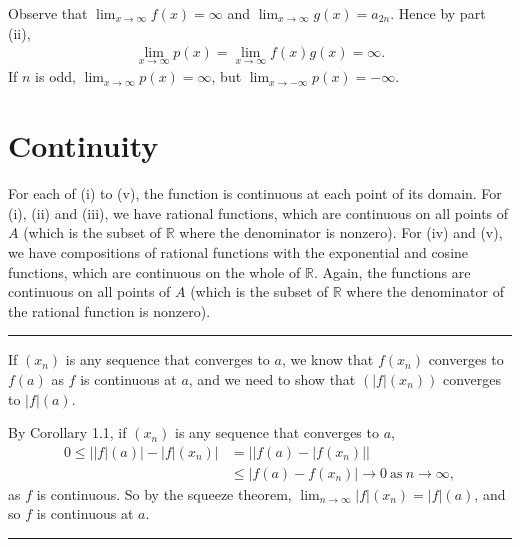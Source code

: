\documentclass[letterpaper,10pt,english]{jupyterBook}
\begin{document}
Observe that \(\displaystyle\lim_{x \rightarrow \infty}f(x) = \infty\) and \(\displaystyle\lim_{x \rightarrow \infty}g(x) = a_{2n}\). Hence by part (ii),
\begin{equation*}
\begin{split}
\lim_{x \rightarrow \infty}p(x) = \lim_{x \rightarrow \infty}f(x)g(x) = \infty.
\end{split}
\end{equation*}
\sphinxAtStartPar
If \(n\) is odd, \(\lim_{x \rightarrow \infty}p(x) = \infty\), but \(\lim_{x \rightarrow -\infty}p(x) = -\infty\).


\section{Continuity}
\label{\detokenize{Solutions-upto46:continuity}}\label{\detokenize{Solutions-upto46:ch3sol}}
\sphinxAtStartPar
{\hyperref[\detokenize{Problems:id13}]{}} For each of (i) to (v), the function is continuous at each point of its domain. For (i), (ii) and (iii), we have rational functions, which are continuous on all points of \(A\) (which is the subset of \(\mathbb{R}\) where the denominator is non\sphinxhyphen{}zero). For (iv) and (v), we have compositions of rational functions with the exponential and cosine functions, which are continuous on the whole of \(\mathbb{R}\). Again, the functions are continuous on all points of \(A\) (which is the subset of \(\mathbb{R}\) where the denominator of the rational function is non\sphinxhyphen{}zero).


\bigskip\hrule\bigskip


\sphinxAtStartPar
{\hyperref[\detokenize{Problems:id14}]{}} If \((x_{n})\) is any sequence that converges to \(a\), we know that \(f(x_n)\) converges to \(f(a)\) as \(f\) is continuous at \(a\), and we need to show that \((|f|(x_n))\) converges to \(|f|(a)\).

By Corollary 1.1, if \((x_{n})\) is any sequence that converges to \(a\),
\begin{align*}
0 \leq ||f|(a)| -|f|(x_{n})| &= ||f(a) - |f(x_{n})|| \\
&\leq |f(a) - f(x_{n})| \rightarrow 0~\mbox{as}~n \rightarrow \infty, 
\end{align*}
\sphinxAtStartPar
as \(f\) is continuous. So by the squeeze theorem, \(\lim_{n\rightarrow\infty} |f|(x_{n}) = |f|(a)\), and so \(f\) is continuous at \(a\).


\bigskip\hrule\bigskip
\end{document}
